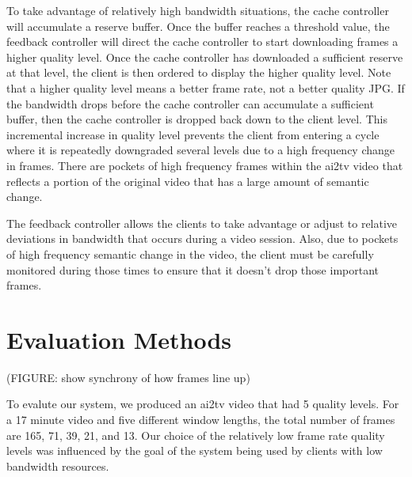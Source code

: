 \documentclass{sig-alternate}
\begin{document}
To take advantage of relatively high bandwidth situations, the cache
controller will accumulate a reserve buffer.  Once the buffer reaches
a threshold value, the feedback controller will direct the cache
controller to start downloading frames a higher quality level.  Once
the cache controller has downloaded a sufficient reserve at that
level, the client is then ordered to display the higher quality level.
Note that a higher quality level means a better frame rate, not a
better quality JPG.  If the bandwidth drops before the cache
controller can accumulate a sufficient buffer, then the cache
controller is dropped back down to the client level.  This incremental
increase in quality level prevents the client from entering a cycle
where it is repeatedly downgraded several levels due to a high
frequency change in frames.  There are pockets of high frequency
frames within the ai2tv video that reflects a portion of the original
video that has a large amount of semantic change.

The feedback controller allows the clients to take advantage or adjust
to relative deviations in bandwidth that occurs during a video
session.  Also, due to pockets of high frequency semantic change in
the video, the client must be carefully monitored during those times
to ensure that it doesn't drop those important frames.

\section{Evaluation Methods} \label{eval}

(FIGURE: show synchrony of how frames line up)

To evalute our system, we produced an ai2tv video that had 5 quality
levels.  For a 17 minute video and five different window lengths, the
total number of frames are 165, 71, 39, 21, and 13.  Our choice of the
relatively low frame rate quality levels was influenced by the goal of
the system being used by clients with low bandwidth resources.
 
\end{document}

